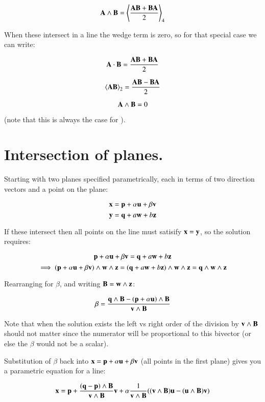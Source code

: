 \documentclass{article}      %
\newcommand{\gpgrade}[2] {{\left\langle{{#1}}\right\rangle}_{#2}}
\newcommand{\gpgradetwo}[1] {\gpgrade{#1}{2}}
\begin{document}
\begin{equation}\label{eqn:AwedgeB}
\BA \wedge \BB = \gpgrade{\frac{\BA \BB + \BB\BA}{2}}{4}
\end{equation}

When these intersect in a line the wedge term is zero, so for that special case we can write:

\begin{equation*}
\mathbf{A} \cdot \mathbf{B} = \frac{\mathbf{A} \mathbf{B} + \mathbf{B}\mathbf{A}}{2}
\end{equation*}

\begin{equation*}
\gpgradetwo{\BA \BB} = \frac{\BA \BB - \BB\BA}{2}
\end{equation*}

\begin{equation*}
\mathbf{A} \wedge \mathbf{B} = 0
\end{equation*}

(note that this is always the case for ).

\section{ Intersection of planes. }

Starting with two planes specified parametrically, each in terms of two direction vectors and a point on the plane:

\[
\mathbf{x} = \mathbf{p} + \alpha \mathbf{u} + \beta \mathbf{v}
\]
\[
\mathbf{y} = \mathbf{q} + a \mathbf{w} + b \mathbf{z}
\]

If these intersect then all points on the line must satisify $\mathbf{x} = \mathbf{y}$, so the
solution requires:

\[
\mathbf{p} + \alpha \mathbf{u} + \beta \mathbf{v} = \mathbf{q} + a \mathbf{w} + b \mathbf{z}
\]
\[
\implies
(\mathbf{p} + \alpha \mathbf{u} + \beta \mathbf{v}) \wedge \mathbf{w} \wedge \mathbf{z} = (\mathbf{q} + a \mathbf{w} + b \mathbf{z}) \wedge \mathbf{w} \wedge \mathbf{z} = \mathbf{q} \wedge \mathbf{w} \wedge \mathbf{z}
\]

Rearranging for $\beta$, and writing $\mathbf{B} = \mathbf{w} \wedge \mathbf{z}$:

\[
\beta = \frac{\mathbf{q} \wedge \mathbf{B} - (\mathbf{p} + \alpha \mathbf{u}) \wedge \mathbf{B}}{\mathbf{v} \wedge \mathbf{B}}
\]

Note that when the solution exists the left vs right order of the division by $\mathbf{v} \wedge \mathbf{B}$ should not matter since the numerator will be proportional to this bivector (or else the $\beta$ would not be a scalar).

Substitution of $\beta$ back into $\mathbf{x} = \mathbf{p} + \alpha \mathbf{u} + \beta \mathbf{v}$ (all points in the first plane) gives you a parametric equation for a line:

\[
\mathbf{x} = \mathbf{p} + \frac{(\mathbf{q}-\mathbf{p})\wedge \mathbf{B}}{\mathbf{v} \wedge \mathbf{B}}\mathbf{v} + \alpha\frac{1}{\mathbf{v} \wedge \mathbf{B}}((\mathbf{v} \wedge \mathbf{B}) \mathbf{u} - (\mathbf{u} \wedge \mathbf{B})\mathbf{v})
\]
\end{document}
